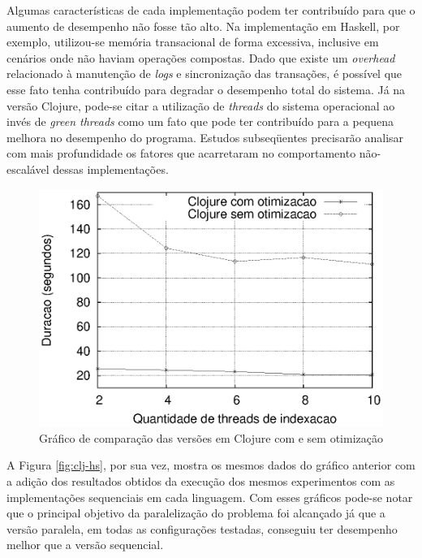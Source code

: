Algumas características de cada implementação podem ter contribuído para que o aumento de desempenho não fosse tão alto. Na implementação em Haskell, por exemplo, utilizou-se memória transacional de forma excessiva, inclusive em cenários onde não haviam operações compostas. Dado que existe um \emph{overhead} relacionado à manutenção de \emph{logs} e sincronização das transações, é possível que esse fato tenha contribuído para degradar o desempenho total do sistema. Já na versão Clojure, pode-se citar a utilização de \emph{threads} do sistema operacional ao invés de \emph{green threads} como um fato que pode ter contribuído para a pequena melhora no desempenho do programa. Estudos subseqüentes precisarão analisar com mais profundidade os fatores que acarretaram no comportamento não-escalável dessas implementações.

\begin{figure}[h]
 \centering
 \includegraphics[scale=0.85]{imagens/clojure-opt.eps}
 \caption{Gráfico de comparação das versões em Clojure com e sem otimização}
 \label{fig:clj-opt}
\end{figure}

A Figura \ref{fig:clj-hs}, por sua vez, mostra os mesmos dados do gráfico anterior com a adição dos resultados obtidos da execução dos mesmos experimentos com as implementações sequenciais em cada linguagem. Com esses gráficos pode-se notar que o principal objetivo da paralelização do problema foi alcançado já que a versão paralela, em todas as configurações testadas, conseguiu ter desempenho melhor que a versão sequencial.

